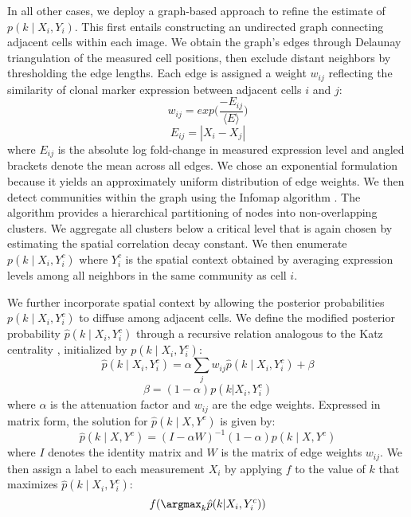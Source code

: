 In all other cases, we deploy a graph-based approach to refine the estimate of $p(k \mid X_i,Y_i)$. This first entails constructing an undirected graph connecting adjacent cells within each image. We obtain the graph's edges through Delaunay triangulation of the measured cell positions, then exclude distant neighbors by thresholding the edge lengths. Each edge is assigned a weight $w_{ij}$ reflecting the similarity of clonal marker expression between adjacent cells $i$ and $j$:
\begin{equation}
w_{ij} = exp \big( \frac{-E_{ij}}{\langle E \rangle} \big)
\end{equation}
\begin{equation}
E_{ij} = | X_i - X_j | 
\end{equation}
where $E_{ij}$ is the absolute log fold-change in measured expression level and angled brackets denote the mean across all edges. We chose an exponential formulation because it yields an approximately uniform distribution of edge weights. We then detect communities within the graph using the Infomap algorithm \cite{Rosvall2009}. The algorithm provides a hierarchical partitioning of nodes into non-overlapping clusters. We aggregate all clusters below a critical level that is again chosen by estimating the spatial correlation decay constant. We then enumerate $p(k \mid X_i,Y_i^c)$ where $Y_i^c$ is the spatial context obtained by averaging expression levels among all neighbors in the same community as cell $i$.

We further incorporate spatial context by allowing the posterior probabilities $p(k \mid X_i,Y_i^c)$ to diffuse among adjacent cells. We define the modified posterior probability $\hat{p}(k \mid X_i,Y_i^c)$ through a recursive relation analogous to the Katz centrality \cite{Katz1953}, initialized by $p(k \mid X_i,Y_i^c)$:
\begin{equation}
\hat{p}(k \mid X_i, Y^c_i) = \alpha \sum_{j}{w_{ij} \hat{p}(k \mid X_i, Y^c _i)} + \beta
\end{equation}
\begin{equation}
\beta = (1-\alpha) p(k| X_i,Y^c_i)
\end{equation}
where $\alpha$ is the attenuation factor and $w_{ij}$ are the edge weights. Expressed in matrix form, the solution for $\hat{p}(k \mid X,Y^c)$ is given by:
\begin{equation}
\hat{p}(k \mid X,Y^c) = ( I - \alpha W )^{-1} (1-\alpha)p(k \mid X, Y^c)
\end{equation}
where $I$ denotes the identity matrix and $W$ is the matrix of edge weights $w_{ij}$. We then assign a label to each measurement $X_i$ by applying $f$ to the value of $k$ that maximizes $\hat{p}(k \mid X_i,Y_i^c)$:
\begin{equation}
f(\argmax_{k} \hat{p}(k | X_i, Y^c_i))
\end{equation}

